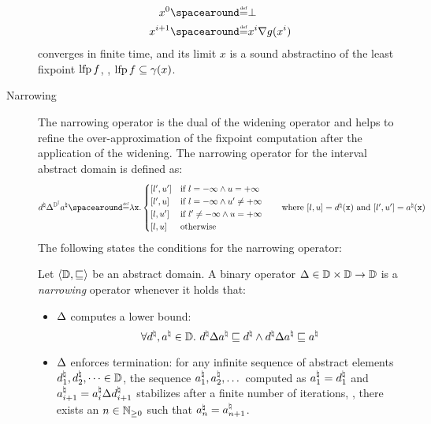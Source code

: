 \begin{description}
\begin{theorem}
    \begin{align*}
      x^0 &\DefeQ \abstractdomainbottom \\
      x^{i+1} &\DefeQ x^i \abstractdomainwidening g(x^i)
    \end{align*}
    converges in finite time, and its limit $x$ is a sound abstractino of the least fixpoint $\operatorname{lfp} f$, \ie, $\operatorname{lfp} f \subseteq \gamma(x)$.
  \end{theorem}
\item[Narrowing]
  The narrowing operator is the dual of the widening operator and helps to refine the over-approximation of the fixpoint computation after the application of the widening.
  The narrowing operator for the interval abstract domain is defined as:
  \begin{align*}
    \defabstractvalue \intervalabstractdomainnarrowing \defotherabstractvalue &\DefeQ \lambda \defvariable.\begin{cases}
      \interval{l'}{u'} & \text{if } l = -\infty \land u = +\infty \\
      \interval{l'}{u} & \text{if } l = -\infty \land u' \neq +\infty \\
      \interval{l}{u'} & \text{if } l' \neq -\infty \land u = +\infty \\
      \interval{l}{u} & \text{otherwise}
    \end{cases} \tag*{where $\interval{l}{u} = \defabstractvalue(\defvariable)$ and $\interval{l'}{u'} = \defotherabstractvalue(\defvariable)$}
  \end{align*}
  The following states the conditions for the narrowing operator:
  \begin{definition}[Narrowing]
    Let $\langle \mathbb{D}, \sqsubseteq \rangle$ be an abstract domain.
    A binary operator $\Delta\in\mathbb{D}\times\mathbb{D}\to\mathbb{D}$ is a \emph{narrowing} operator whenever it holds that:
    \begin{itemize}
      \item $\Delta$ computes a lower bound:
      \[\forall d^\natural, a^\natural \in \mathbb{D}.~ d^\natural \Delta a^\natural \sqsubseteq d^\natural \land d^\natural \Delta a^\natural \sqsubseteq a^\natural\]
      \item $\Delta$ enforces termination: for any infinite sequence of abstract elements $d^\natural_1, d^\natural_2, \dots \in \mathbb{D}$, the sequence $a^\natural_1, a^\natural_2, \dots$ computed as $a^\natural_1 = d^\natural_1$ and $a^\natural_{i+1} = a^\natural_i \Delta d^\natural_{i+1}$ stabilizes after a finite number of iterations, \ie, there exists an $n \in \mathbb{N}_{\ge0}$ such that $a^\natural_n = a^\natural_{n+1}$.

\end{itemize}
\end{definition}
\end{description}
